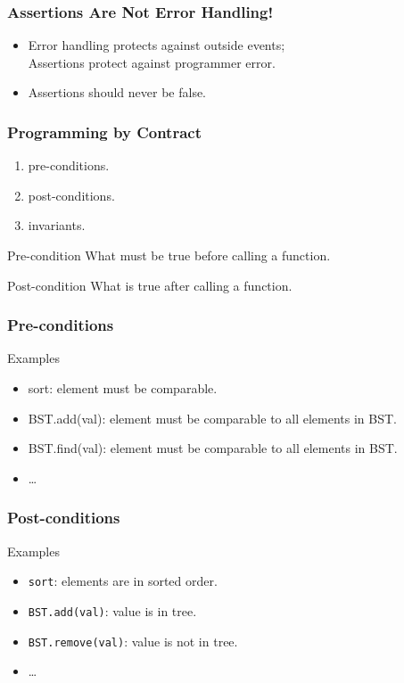 \begin{frame}[fragile]
\frametitle{Assertions Are Not Error Handling!}

\begin{itemize}
\item Error handling protects against outside events;\\
    Assertions protect against programmer error.
\item Assertions \alert{should never} be false.
\end{itemize}
\end{frame}

\begin{frame}[fragile]
\frametitle{Programming by Contract}
\begin{enumerate}
\item pre-conditions.
\item post-conditions.
\item invariants.
\end{enumerate}
\end{frame}

\begin{frame}[fragile]

\begin{block}{Pre-condition}
What must be true before calling a function.
\end{block}

\begin{block}{Post-condition}
What is true after calling a function.
\end{block}
\end{frame}

\begin{frame}[fragile]
\frametitle{Pre-conditions}

\begin{block}{Examples}
\begin{itemize}
\item sort: element must be comparable.
\item BST.add(val): element must be comparable to all elements in BST.
\item BST.find(val): element must be comparable to all elements in BST.
\item \ldots
\end{itemize}
\end{block}
\end{frame}

\begin{frame}[fragile]
\frametitle{Post-conditions}

\begin{block}{Examples}
\begin{itemize}
\item \lstinline{sort}: elements are in sorted order.
\item \lstinline{BST.add(val)}: value is in tree.
\item \lstinline{BST.remove(val)}: value is not in tree.
\item \ldots
\end{itemize}
\end{block}
\end{frame}

